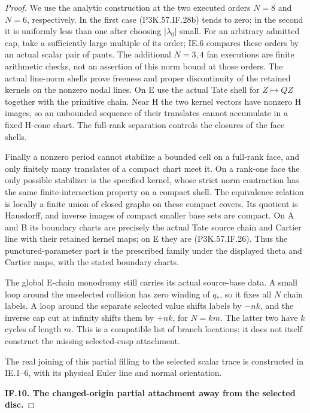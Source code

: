 \begin{proof}
We use the analytic construction at the two executed
orders \(N=8\) and \(N=6\), respectively. In the first
case (P3K.57.IF.28b) tends to zero; in the second it is
uniformly less than one after choosing \(|\lambda_0|\)
small. For an arbitrary admitted cap, take a sufficiently
large multiple of its order; IE.6 compares these orders
by an actual scalar pair of pants. The additional
\(N=3,4\) fan executions are finite arithmetic checks,
not an assertion of this norm bound at those orders.
The actual line-norm shells prove freeness and proper
discontinuity of the retained kernels on the nonzero
nodal lines. On E use the actual Tate shell for
\(Z\mapsto QZ\) together with the primitive chain.
Near H the two kernel vectors have nonzero H images,
so an unbounded sequence of their translates cannot
accumulate in a fixed H-cone chart. The full-rank
separation controls the closures of the face shells.

Finally a nonzero period cannot stabilize a bounded
cell on a full-rank face, and only finitely many
translates of a compact chart meet it. On a rank-one
face the only possible stabilizer is the specified
kernel, whose strict norm contraction has the same
finite-intersection property on a compact shell.
The equivalence relation is locally a finite union
of closed graphs on these compact covers. Its quotient
is Hausdorff, and inverse images of compact smaller
base sets are compact. On A and B its boundary charts
are precisely the actual Tate source chain and
Cartier line with their retained kernel maps; on E
they are (P3K.57.IF.26). Thus the punctured-parameter part
is the prescribed family under the displayed theta
and Cartier maps, with the stated boundary charts.

The global E-chain monodromy still carries its actual source-base
data. A small loop around the unselected collision has zero winding
of \(q_*\), so it fixes all \(N\) chain labels. A loop around the
separate selected value shifts labels by \(-nk\), and the inverse
cap cut at infinity shifts them by \(+nk\), for \(N=km\).
The latter two have \(k\) cycles of length \(m\). This is a
compatible list of branch locations; it does not itself construct
the missing selected-cusp attachment.

The real joining of this partial filling to the selected scalar trace is
constructed in IE.1--6, with its physical Euler line and normal orientation.

\par\medskip\noindent\textbf{IF.10. The changed-origin partial attachment away from the selected disc.}\par\nopagebreak[4]


\end{proof}
